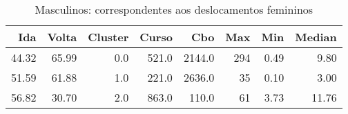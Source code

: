 \begin{table}
\centering
\caption{Masculinos: correspondentes aos deslocamentos femininos}
\label{tab:Salarios_Desequlibrio_F}
\begin{tabular}{rrrrrrrr}
\toprule
  Ida &  Volta &  Cluster &  Curso &    Cbo &  Max &  Min &  Median \\
\midrule
44.32 &  65.99 &      0.0 &  521.0 & 2144.0 &  294 & 0.49 &    9.80 \\
51.59 &  61.88 &      1.0 &  221.0 & 2636.0 &   35 & 0.10 &    3.00 \\
56.82 &  30.70 &      2.0 &  863.0 &  110.0 &   61 & 3.73 &   11.76 \\
\bottomrule
\end{tabular}
\end{table}

